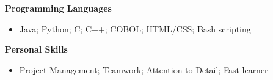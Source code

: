 \documentclass[class=article, crop=false]{standalone}
\begin{document}
\textbf{Programming Languages} 
\begin{itemize}[leftmargin=*]
    \item Java; Python; C; C++; COBOL; HTML/CSS; Bash scripting
\end{itemize}

\split 

\textbf{Personal Skills} 
\begin{itemize}[leftmargin=*]
    \item Project Management; Teamwork; Attention to Detail; Fast learner
\end{itemize}
\end{document}
